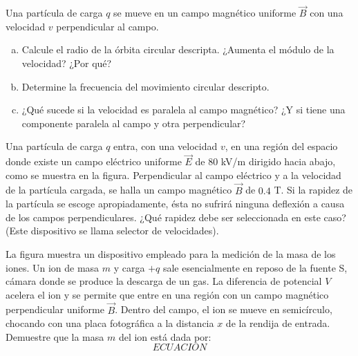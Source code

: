 \documentclass[problemas]{guia}
\begin{document}
 
\maketitle


\begin{problema}{}
    Una partícula de carga $q$ se mueve en un campo magnético uniforme 
    $\vec{B}$ con una velocidad $v$ perpendicular al campo.
    \begin{enumerate}[(a)]
        \item Calcule el radio de la órbita circular descripta. ¿Aumenta el 
            módulo de la velocidad? ¿Por qué?
        \item Determine la frecuencia del movimiento circular descripto.
        \item ¿Qué sucede si la velocidad es paralela al campo magnético? ¿Y 
            si tiene una componente paralela al campo y otra perpendicular?
    \end{enumerate}
\end{problema}

\begin{problema}{}
    Una partícula de carga $q$ entra, con una velocidad $v$, en una región del
    espacio donde existe un campo eléctrico uniforme $\vec{E}$ de 80 kV/m 
    dirigido hacia abajo, como se muestra en la figura. Perpendicular al campo 
    eléctrico y a la velocidad de la partícula cargada, se halla un campo
    magnético $\vec{B}$ de $0.4$ T. Si la rapidez de la partícula se escoge 
    apropiadamente, ésta no sufrirá ninguna deflexión a causa de los campos 
    perpendiculares. ¿Qué rapidez debe ser seleccionada en este caso? 
    (Este dispositivo se llama selector de velocidades).
\end{problema}

\begin{problema}{}
    La figura muestra un dispositivo empleado para la medición de la masa de 
    los iones. Un ion de masa $m$ y carga $+q$ sale esencialmente en reposo 
    de la fuente S, cámara donde se produce la descarga de un gas. La 
    diferencia de potencial $V$ acelera el ion y se permite que entre  en  una 
    región  con  un  campo  magnético  perpendicular uniforme $\vec{B}$. 
    Dentro del campo, el ion se mueve en semicírculo, chocando con una placa 
    fotográfica a la distancia $x$ de la rendija de entrada. Demuestre que la 
    masa $m$ del ion está dada por:
    \begin{equation*}
        ECUACION
    \end{equation*}
\end{problema}
\end{document}
